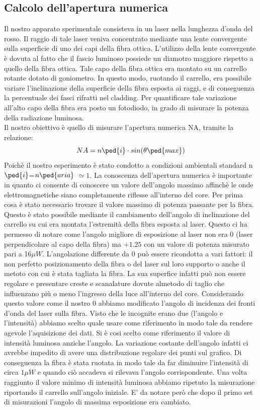 \documentclass[a4paper,11pt]{article}
\begin{document}
\subsection{Calcolo dell'apertura numerica}
Il nostro apparato sperimentale consisteva in un laser nella lunghezza d'onda del rosso. Il raggio di tale laser veniva concentrato mediante una lente convergente sulla superficie di uno dei capi della fibra ottica. L'utilizzo della lente convergente è dovuta al fatto che il fascio luminoso possiede un diamotro maggiore rispetto a quello della fibra ottica. Tale capo della fibra ottica era montato su un carrello rotante dotato di goniometro. In questo modo, ruotando il carrello, era possibile variare l'inclinazione della superficie della fibra esposta ai raggi, e di conseguenza la percentuale dei fasci rifratti nel cladding. Per quantificare tale variazione all'alto capo della fibra era posto un fotodiodo, in grado di misurare la potenza della radiazione luminosa. \\
Il nostro obiettivo è quello di misurare l'apertura numerica NA, tramite la relazione: $$NA=n\ped{i}\cdot sin(\theta \ped{max}) $$  
Poichè il nostro esperimento è stato condotto a condizioni ambientali standard n$\ped{i}$=$n\ped{aria}$ $\simeq 1$. La conoscenza dell'apertura numerica è importante in quanto ci consente di conoscere un valore dell'angolo massimo affinchè le onde elettromagnetiche siano completamente riflesse all'interno del core. 
Per prima cosa è stato necessario trovare il valore massimo di potenza passante per la fibra. Questo è stato possibile mediante il cambiamento dell'angolo di inclinazione del carrello su cui era montata l'estremità della fibra esposta al laser. Questo ci ha permesso di notare come l'angolo migliore di esposizione al laser non era $ 0 $ (laser perpendicolare al capo della fibra) ma $ +1.25 $ con un valore di potenza misurato pari a 16$ \mu W $. L'angolazione differente da 0 può essere ricondotta a vari fattori: il non perfetto posizionamento della fibra o del laser sul loro supporto o anche il metoto con cui è stata tagliata la fibra. La sua superfice infatti può non essere regolare e presentare creste e scanalature dovute almetodo di taglio che influenzano più o meno l'ingresso della luce all'interno del core.
Considerando questo valore come il nostro 0 abbiamo modificato l'angolo di incidenza dei fronti d'onda del laser sulla fibra.
Visto che le incognite erano due (l'angolo e l'intensità) abbiamo scelto quale usare come riferimento in modo tale da rendere agevole l'aquisizione dei dati. Si è cosi scelto come riferimento il valore di intensità luminosa anziche l'angolo. La variazione costante dell'angolo infatti ci avrebbe impedito di avere una distribuzione regolare dei punti sul grafico.
Di conseguenza la fibra è stata ruotata in modo tale da far diminuire l'intensità di circa $ 1\mu W$ e quando ciò accadeva si rilevava l'angolo corrispondente. Una volta raggiunto il valore minimo di intensità luminosa abbiamo ripetuto la misurazione riportando il carrello sull'angolo iniziale. E' da notare però che dopo il primo set di misurazioni l'angolo di massima esposizione era cambiato.
\end{document}
